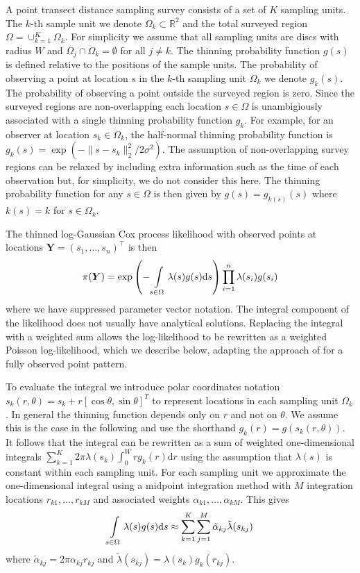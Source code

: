 \documentclass[preprint,12pt]{elsarticle}
\newcommand{\bm}{\boldsymbol}  %
\newcommand{\tl}{\tilde{\lambda}}   %
\begin{document}
A point transect distance sampling survey consists of a set of $K$ sampling units.  The $k$-th sample unit we denote $\Omega_k \subset \mathbb{R}^2$ and the total surveyed region $\Omega = \cup_{k=1}^K \Omega_k$.  For simplicity we assume that all sampling units are discs with radius $W$ and $\Omega_j \cap \Omega_k = \emptyset$ for all $j \neq k$.  The thinning probability function $g(s)$ is defined relative to the positions of the sample units.  The probability of observing a point at location $s$ in the $k$-th sampling unit $\Omega_k$ we denote $g_k(s)$.  The probability of observing a point outside the surveyed region is zero.
Since the surveyed regions are non-overlapping each location $s \in \Omega$ is unambigiously associated with a single thinning probability function $g_k$.  For example, for an observer at location $s_k \in \Omega_k$, the half-normal thinning probability function is $g_k(s) = \exp(-\lVert s - s_k \rVert_2^2 / 2\sigma^2)$. The assumption of non-overlapping survey regions can be relaxed by including extra information such as the time of each observation but, for simplicity, we do not consider this here.  The thinning probability function for any $s \in \Omega$ is then given by $g(s) = g_{k(s)}(s)$ where $k(s) = k$ for $s \in \Omega_k$.

The thinned log-Gaussian Cox process likelihood with observed points at locations $\bm{Y} = (s_1, \ldots, s_n)^\intercal$ is then
\begin{equation}
\label{lgcp-likelihood}
\pi(\bm{Y}) = \exp\left(-\int\displaylimits_{s \in \Omega} \lambda(s) g(s) \mathrm{d}s \right)\prod_{i=1}^n \lambda(s_i)g(s_i)
\end{equation}
where we have suppressed parameter vector notation.  The integral component of the likelihood does not usually have analytical solutions.  Replacing the integral with a weighted sum allows the log-likelihood to be rewritten as a weighted Poisson log-likelihood, which we describe below, adapting the approach of \cite{simpson_going_2016} for a fully observed point pattern.

To evaluate the integral we introduce polar coordinates notation $s_k(r, \theta) = s_k + r\left[\cos\theta, \sin\theta \right]^T$ to represent locations in each sampling unit $\Omega_k$.   In general the thinning function depends only on $r$ and not on $\theta$.  We assume this is the case in the following and use the shorthand $g_k(r) = g(s_k(r, \theta))$. It follows that the integral can be rewritten as a sum of weighted one-dimensional integrals $\sum_{k=1}^K 2\pi \lambda(s_k) \int_0^W r g_k(r)\mathrm{d}r$ using the assumption that $\lambda(s)$ is constant within each sampling unit.  For each sampling unit we approximate the one-dimensional integral using a midpoint integration method with $M$ integration locations $r_{k1}, \ldots, r_{kM}$ and associated weights $\alpha_{k1}, \ldots, \alpha_{kM}$.  This gives
\begin{equation*}
	\int\displaylimits_{s \in \Omega} \lambda(s)g(s)\mathrm{d}s \approx \sum_{k=1}^K \sum_{j=1}^M \tilde{\alpha}_{kj} \tl(s_{kj})
\end{equation*}
where $\tilde{\alpha}_{kj} = 2\pi \alpha_{kj}r_{kj}$ and $\tl(s_{kj}) = \lambda(s_k) g_k(r_{kj})$.
\end{document}

